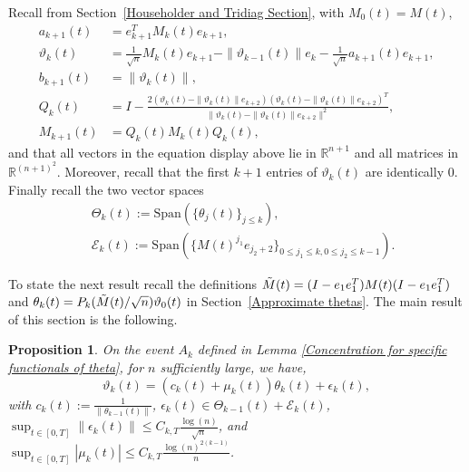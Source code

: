 \documentclass{amsart}
\newtheorem{prop}[thm]{Proposition}
\numberwithin{equation}{section}
\newcommand{\R}{\mathbb{R}}
\begin{document}
Recall from Section~\ref{Householder and Tridiag Section}, with $M_0(t)=M(t)$, 
\begin{equation}
    \begin{split}
        a_{k+1}(t)&=e_{k+1}^T M_k(t)e_{k+1},\\
        \vartheta_{k}(t)&=\frac{1}{\sqrt{n}}M_k(t)e_{k+1}-\|\vartheta_{k-1}(t)\|e_k-\frac{1}{\sqrt{n}}a_{k+1}(t)e_{k+1},\\
        b_{k+1}(t) &= \|\vartheta_k(t)\|,\\
         Q_k(t)&=I-\frac{2(\vartheta_k(t)-\|\vartheta_k(t)\|e_{k+2})(\vartheta_k(t)-\|\vartheta_k(t)\|e_{k+2})^T}{\|\vartheta_k(t)-\|\vartheta_k(t)\|e_{k+2}\|^2},\\
        M_{k+1}(t) &= Q_k(t)M_k(t)Q_k(t),
    \end{split}
\end{equation}
and that all vectors in the equation display above lie in $\R^{n+1}$ and all matrices in $\R^{(n+1)^2}$. Moreover, recall that the first $k+1$ entries of $\vartheta_k(t)$ are identically $0$.
Finally recall the two vector spaces 
\begin{equation*}  
    \begin{split} ~&\Theta_k(t):=\mathrm{Span}(\{\theta_j(t)\}_{j\leq k}),\\
    &\mathcal{E}_k(t):= \mathrm{Span}(\{M(t)^{j_1}e_{j_2+2}\}_{0 \leq j_1 \leq k, 0 \leq j_2 \leq k-1}).
    \end{split}
\end{equation*}


To state the next result recall the definitions $\Tilde{M}(t)=(I-e_1e_1^T) M(t) (I-e_1e_1^T)$ and $\theta_k(t)=P_k(\Tilde{M}(t)/\sqrt{n})\vartheta_0(t)$ in Section~\ref{Approximate thetas}. The main result of this section is the following.
\begin{prop}
   On the event $A_k$ defined in Lemma \ref{Concentration for specific functionals of theta}, for $n$ sufficiently large, we have,
\begin{equation}\label{vartheta = theta + epsilon}
        \vartheta_k(t) = (c_k(t)+\mu_k(t))\theta_k(t)+\epsilon_k(t),
    \end{equation}
    with $c_k(t):=\frac{1}{\|\theta_{k-1}(t)\|}$, $\epsilon_k(t) \in \Theta_{k-1}(t)+ \mathcal{E}_k(t)$, $\sup_{t \in [0,T]}\|\epsilon_k(t)\| \leq C_{k,T} \frac{\log(n)}{\sqrt{n}}$, and $\sup_{t \in [0,T]} |\mu_k(t)| \leq C_{k,T}\frac{\log(n)^{2(k-1)}}{n}$.
\end{prop}
\end{document}
